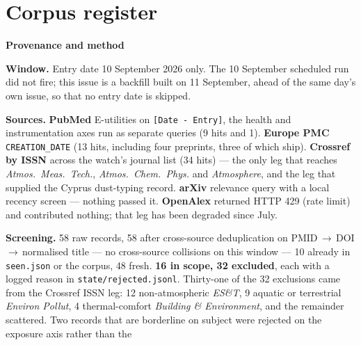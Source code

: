 \documentclass[10pt]{article}
\begin{document}
\clearpage

\section*{\sffamily\bfseries\color{Deep}Corpus register}
\vspace{-1.5mm}{\color{Amber}\rule{\linewidth}{1.1pt}}\vspace{2.5mm}



\vspace{4mm}
\begin{keybox}
{\sffamily\bfseries\footnotesize\color{Deep}Provenance and method}\\[1.2mm]
{\fontsize{7.2}{8.8}\selectfont
\textbf{Window.} Entry date 10 September 2026 only. The 10 September scheduled run did not
fire; this issue is a backfill built on 11 September, ahead of the same day's own issue, so
that no entry date is skipped.\par
\vspace{0.8mm}
\textbf{Sources.} \textbf{PubMed} E-utilities on \texttt{[Date - Entry]}, the health and
instrumentation axes run as separate queries (9 hits and 1). \textbf{Europe PMC}
\texttt{CREATION\_DATE} (13 hits, including four preprints, three of which ship).
\textbf{Crossref by ISSN} across the watch's journal list (34 hits) --- the only leg that
reaches \textit{Atmos.\ Meas.\ Tech.}, \textit{Atmos.\ Chem.\ Phys.} and
\textit{Atmosphere}, and the leg that supplied the Cyprus dust-typing record.
\textbf{arXiv} relevance query with a local recency screen --- nothing passed it.
\textbf{OpenAlex} returned HTTP 429 (rate limit) and contributed nothing; that leg has been
degraded since July.\par
\vspace{0.8mm}
\textbf{Screening.} 58 raw records, 58 after cross-source deduplication on
PMID\,$\rightarrow$\,DOI\,$\rightarrow$\,normalised title --- no cross-source collisions on
this window --- 10 already in \texttt{seen.json} or the corpus, 48 fresh.
\textbf{16 in scope, 32 excluded}, each with a logged reason in
\texttt{state/rejected.jsonl}. Thirty-one of the 32 exclusions came from the Crossref ISSN
leg: 12 non-atmospheric \textit{ES\&T}, 9 aquatic or terrestrial \textit{Environ Pollut},
4 thermal-comfort \textit{Building \& Environment}, and the remainder scattered. Two
records that are borderline on subject were rejected on the exposure axis rather than the
}
\end{keybox}
\end{document}
